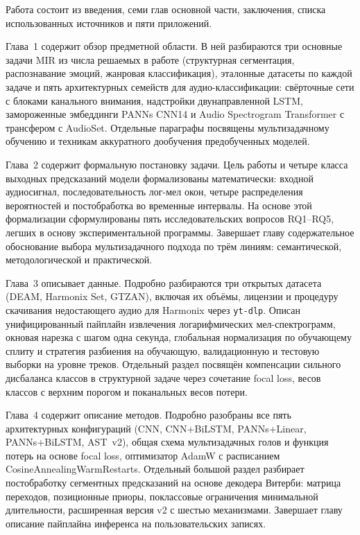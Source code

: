 \structure

Работа состоит из введения, семи глав основной части, заключения, списка использованных источников и пяти приложений.

Глава~1 содержит обзор предметной области. В ней разбираются три основные задачи MIR из числа решаемых в работе (структурная сегментация, распознавание эмоций, жанровая классификация), эталонные датасеты по каждой задаче и пять архитектурных семейств для аудио-классификации: свёрточные сети с блоками канального внимания, надстройки двунаправленной LSTM, замороженные эмбеддинги PANNs CNN14 и Audio Spectrogram Transformer с трансфером с AudioSet. Отдельные параграфы посвящены мультизадачному обучению и техникам аккуратного дообучения предобученных моделей.

Глава~2 содержит формальную постановку задачи. Цель работы и четыре класса выходных предсказаний модели формализованы математически: входной аудиосигнал, последовательность лог-мел окон, четыре распределения вероятностей и постобработка во временные интервалы. На основе этой формализации сформулированы пять исследовательских вопросов RQ1--RQ5, легших в основу экспериментальной программы. Завершает главу содержательное обоснование выбора мультизадачного подхода по трём линиям: семантической, методологической и практической.

Глава~3 описывает данные. Подробно разбираются три открытых датасета (DEAM, Harmonix Set, GTZAN), включая их объёмы, лицензии и процедуру скачивания недостающего аудио для Harmonix через \texttt{yt-dlp}. Описан унифицированный пайплайн извлечения логарифмических мел-спектрограмм, окновая нарезка с шагом одна секунда, глобальная нормализация по обучающему сплиту и стратегия разбиения на обучающую, валидационную и тестовую выборки на уровне треков. Отдельный раздел посвящён компенсации сильного дисбаланса классов в структурной задаче через сочетание focal loss, весов классов с верхним порогом и поканальных весов потери.

Глава~4 содержит описание методов. Подробно разобраны все пять архитектурных конфигураций (CNN, CNN+BiLSTM, PANNs+Linear, PANNs+BiLSTM, AST~v2), общая схема мультизадачных голов и функция потерь на основе focal loss, оптимизатор AdamW с расписанием CosineAnnealingWarmRestarts. Отдельный большой раздел разбирает постобработку сегментных предсказаний на основе декодера Витерби: матрица переходов, позиционные приоры, поклассовые ограничения минимальной длительности, расширенная версия v2 с шестью механизмами. Завершает главу описание пайплайна инференса на пользовательских записях.

